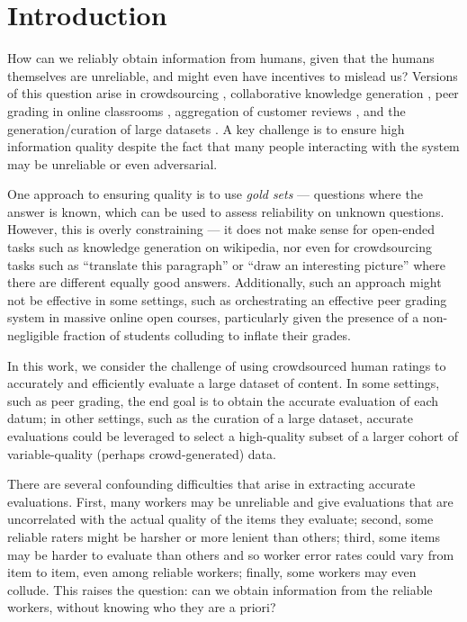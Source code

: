 \section{Introduction}
\label{sec:intro}


How can we reliably obtain information from humans, given that the humans 
themselves are unreliable, and might even have incentives to mislead us?
Versions of this question arise in crowdsourcing \citep{vuurens2011spam}, 
collaborative knowledge generation \citep{priedhorsky2007creating}, peer grading 
in online classrooms \citep{kulkarni2015peer,piech2013tuned},  aggregation 
of customer reviews \citep{harmon2004amazon}, and the generation/curation of large datasets \citep{deng2009imagenet}. A key challenge is to ensure 
high information quality despite the fact that many people interacting with 
the system may be unreliable or even adversarial.

One approach to ensuring quality is to use \emph{gold sets} --- questions where 
the answer is known, which can be used to assess reliability on unknown questions. 
However, this is overly constraining --- it does not make sense for open-ended 
tasks such as knowledge generation on wikipedia, nor even for crowdsourcing 
tasks such as ``translate this paragraph'' or ``draw an interesting picture'' 
where there are different equally good answers.   Additionally, such an approach might not be effective in some settings, such as orchestrating an effective peer grading system in massive online open courses, particularly given the presence of a non-negligible fraction of students colluding to inflate their grades.

In this work, we consider the challenge of using crowdsourced human ratings to accurately and efficiently evaluate a large dataset of content.   In some settings, such as peer grading, the end goal is to obtain the accurate evaluation of each datum; in other settings, such as the curation of a large dataset, accurate evaluations could be leveraged to select a high-quality subset of a larger cohort of variable-quality (perhaps crowd-generated) data.  

There are several confounding difficulties that arise in extracting accurate evaluations.  First, many workers may be unreliable and give evaluations that are uncorrelated with the actual quality of the items they evaluate; 
second, some reliable raters might be harsher or more lenient than others; 
third, some items may be harder to evaluate than others 
and so worker error rates could vary from item to item, even among reliable workers; 
finally, some workers may even collude. %
This raises the question: can we obtain 
information from the reliable workers, without knowing who they are a priori?


